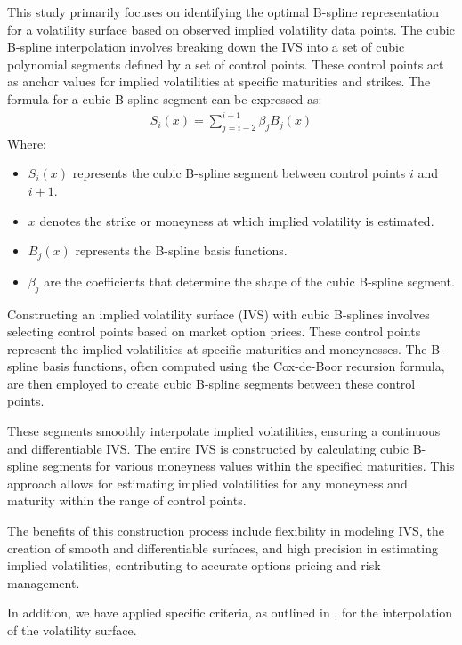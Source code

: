 This study primarily focuses on identifying the optimal B-spline representation for a volatility surface based on observed implied volatility data points. The cubic B-spline interpolation involves breaking down the IVS into a set of cubic polynomial segments defined by a set of control points. These control points act as anchor values for implied volatilities at specific maturities and strikes. The formula for a cubic B-spline segment can be expressed as:
\begin{align}
    S_i(x) = \sum_{j=i-2}^{i+1}\beta_jB_j(x) \label{B-spline}
\end{align}
Where:
\begin{itemize}
    \item $S_i(x)$ represents the cubic B-spline segment between control points $i$ and $i+1$. 
    \item $x$ denotes the strike or moneyness at which implied volatility is estimated.
    \item $B_j(x)$ represents the B-spline basis functions.
    \item $\beta_j$ are the coefficients that determine the shape of the cubic B-spline segment.
\end{itemize}
Constructing an implied volatility surface (IVS) with cubic B-splines involves selecting control points based on market option prices. These control points represent the implied volatilities at specific maturities and moneynesses. The B-spline basis functions, often computed using the Cox-de-Boor recursion formula, are then employed to create cubic B-spline segments between these control points.

These segments smoothly interpolate implied volatilities, ensuring a continuous and differentiable IVS. The entire IVS is constructed by calculating cubic B-spline segments for various moneyness values within the specified maturities. This approach allows for estimating implied volatilities for any moneyness and maturity within the range of control points.

The benefits of this construction process include flexibility in modeling IVS, the creation of smooth and differentiable surfaces, and high precision in estimating implied volatilities, contributing to accurate options pricing and risk management.

In addition, we have applied specific criteria, as outlined in \cite{Verma2008ImpliedVM}, for the interpolation of the volatility surface.

